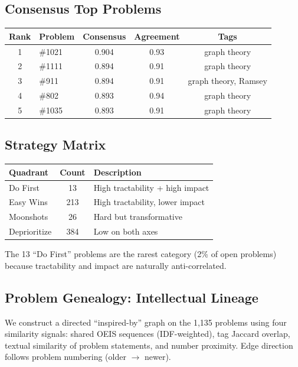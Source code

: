 \documentclass[11pt,a4paper]{article}
\theoremstyle{definition}
\theoremstyle{remark}
\begin{document}
\subsection{Consensus Top Problems}

\begin{center}
\begin{tabular}{clccc}
\toprule
Rank & Problem & Consensus & Agreement & Tags \\
\midrule
1 & \#1021 & 0.904 & 0.93 & graph theory \\
2 & \#1111 & 0.894 & 0.91 & graph theory \\
3 & \#911 & 0.894 & 0.91 & graph theory, Ramsey \\
4 & \#802 & 0.893 & 0.94 & graph theory \\
5 & \#1035 & 0.893 & 0.91 & graph theory \\
\bottomrule
\end{tabular}
\end{center}

\subsection{Strategy Matrix}

\begin{center}
\begin{tabular}{lcp{6cm}}
\toprule
Quadrant & Count & Description \\
\midrule
Do First & 13 & High tractability + high impact \\
Easy Wins & 213 & High tractability, lower impact \\
Moonshots & 26 & Hard but transformative \\
Deprioritize & 384 & Low on both axes \\
\bottomrule
\end{tabular}
\end{center}

The 13 ``Do First'' problems are the rarest category (2\% of open problems)
because tractability and impact are naturally anti-correlated.

\subsection{Problem Genealogy: Intellectual Lineage}

We construct a directed ``inspired-by'' graph on the 1,135 problems using
four similarity signals: shared OEIS sequences (IDF-weighted), tag Jaccard
overlap, textual similarity of problem statements, and number proximity.
Edge direction follows problem numbering (older $\to$ newer).
\end{document}
